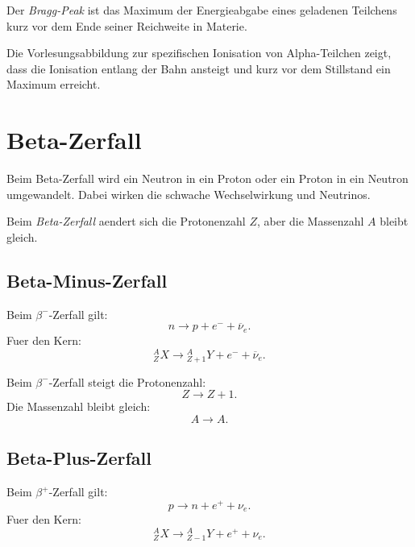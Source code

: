 \begin{definitionbox}
Der \emph{Bragg-Peak} ist das Maximum der Energieabgabe eines geladenen Teilchens
kurz vor dem Ende seiner Reichweite in Materie.
\end{definitionbox}

\begin{notebox}
Die Vorlesungsabbildung zur spezifischen Ionisation von Alpha-Teilchen zeigt,
dass die Ionisation entlang der Bahn ansteigt und kurz vor dem Stillstand ein Maximum
erreicht.
\end{notebox}

\section{Beta-Zerfall}

Beim Beta-Zerfall wird ein Neutron in ein Proton oder ein Proton in ein Neutron
umgewandelt.
Dabei wirken die schwache Wechselwirkung und Neutrinos.

\begin{definitionbox}
Beim \emph{Beta-Zerfall} aendert sich die Protonenzahl $Z$, aber die Massenzahl $A$
bleibt gleich.
\end{definitionbox}

\subsection{Beta-Minus-Zerfall}

\begin{formulabox}
Beim $\beta^-$-Zerfall gilt:
\[
    n \rightarrow p + e^- + \overline{\nu}_e.
\]
Fuer den Kern:
\[
    {}^{A}_{Z}X
    \rightarrow
    {}^{A}_{Z+1}Y
    +
    e^-
    +
    \overline{\nu}_e.
\]
\end{formulabox}

\begin{conceptbox}
Beim $\beta^-$-Zerfall steigt die Protonenzahl:
\[
    Z \rightarrow Z+1.
\]
Die Massenzahl bleibt gleich:
\[
    A \rightarrow A.
\]
\end{conceptbox}

\subsection{Beta-Plus-Zerfall}

\begin{formulabox}
Beim $\beta^+$-Zerfall gilt:
\[
    p \rightarrow n + e^+ + \nu_e.
\]
Fuer den Kern:
\[
    {}^{A}_{Z}X
    \rightarrow
    {}^{A}_{Z-1}Y
    +
    e^+
    +
    \nu_e.
\]
\end{formulabox}


